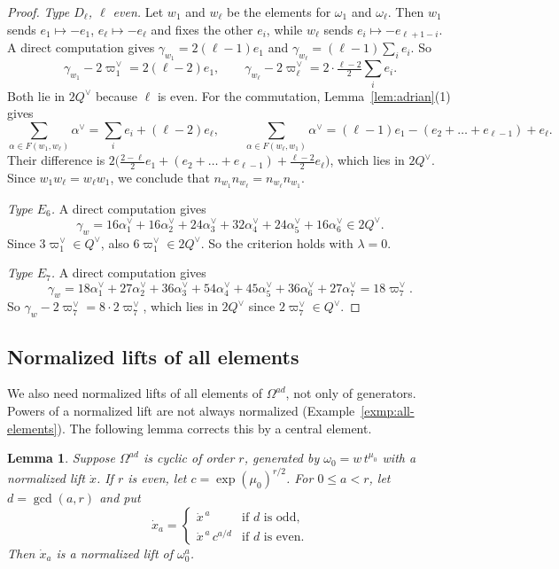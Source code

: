 \documentclass[psamsfonts]{amsart}
\newtheorem{lem}[thm]{Lemma}
\theoremstyle{definition}
\theoremstyle{remark}
\numberwithin{equation}{section}
\numberwithin{equation}{section}
\newcommand{\om}{\omega}
\newcommand{\Om}{\Omega}
\theoremstyle{plain}
\begin{document}
\begin{proof}
\emph{Type $D_\ell$, $\ell$ even.} Let $w_1$ and $w_\ell$ be the elements for $\om_1$ and $\om_\ell$. Then $w_1$ sends $e_1\mapsto-e_1$, $e_\ell\mapsto-e_\ell$ and fixes the other $e_i$, while $w_\ell$ sends $e_i\mapsto-e_{\ell+1-i}$. A direct computation gives $\gamma_{w_1}=2(\ell-1)e_1$ and $\gamma_{w_\ell}=(\ell-1)\sum_ie_i$. So
\[
\gamma_{w_1}-2\varpi_1^\vee=2(\ell-2)e_1,\qquad\gamma_{w_\ell}-2\varpi_\ell^\vee=2\cdot\tfrac{\ell-2}{2}\sum_ie_i.
\]
Both lie in $2Q^\vee$ because $\ell$ is even. For the commutation, Lemma~\ref{lem:adrian}(1) gives
\[
\sum_{\alpha\in F(w_1,w_\ell)}\alpha^\vee=\sum_ie_i+(\ell-2)e_\ell,\qquad
\sum_{\alpha\in F(w_\ell,w_1)}\alpha^\vee=(\ell-1)e_1-(e_2+\dots+e_{\ell-1})+e_\ell.
\]
Their difference is $2\big(\tfrac{2-\ell}{2}e_1+(e_2+\dots+e_{\ell-1})+\tfrac{\ell-2}{2}e_\ell\big)$, which lies in $2Q^\vee$. Since $w_1w_\ell=w_\ell w_1$, we conclude that $n_{w_1}n_{w_\ell}=n_{w_\ell}n_{w_1}$.

\emph{Type $E_6$.} A direct computation gives
\[
\gamma_w=16\alpha_1^\vee+16\alpha_2^\vee+24\alpha_3^\vee+32\alpha_4^\vee+24\alpha_5^\vee+16\alpha_6^\vee\in2Q^\vee.
\]
Since $3\varpi_1^\vee\in Q^\vee$, also $6\varpi_1^\vee\in2Q^\vee$. So the criterion holds with $\lambda=0$.

\emph{Type $E_7$.} A direct computation gives
\[
\gamma_w=18\alpha_1^\vee+27\alpha_2^\vee+36\alpha_3^\vee+54\alpha_4^\vee+45\alpha_5^\vee+36\alpha_6^\vee+27\alpha_7^\vee=18\varpi_7^\vee.
\]
So $\gamma_w-2\varpi_7^\vee=8\cdot2\varpi_7^\vee$, which lies in $2Q^\vee$ since $2\varpi_7^\vee\in Q^\vee$.
\end{proof}

\subsection{Normalized lifts of all elements}
We also need normalized lifts of all elements of $\Om^{ad}$, not only of generators. Powers of a normalized lift are not always normalized (Example~\ref{exmp:all-elements}). The following lemma corrects this by a central element.

\begin{lem}\label{lem:powers}
Suppose $\Om^{ad}$ is cyclic of order $r$, generated by $\om_0=w\,t^{\mu_0}$ with a normalized lift $\dot x$. If $r$ is even, let $c=\exp(\mu_0)^{r/2}$. For $0\leq a<r$, let $d=\gcd(a,r)$ and put
\[
\dot x_a=\begin{cases}\dot x^{\,a}&\text{if }d\text{ is odd},\\ \dot x^{\,a}\,c^{a/d}&\text{if }d\text{ is even}.\end{cases}
\]
Then $\dot x_a$ is a normalized lift of $\om_0^a$.
\end{lem}
\end{document}
